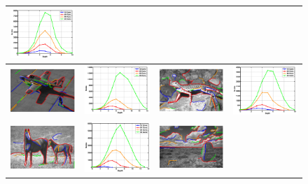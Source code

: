 \begin{figure}[ht]
\begin{tabular}{|cc|cc|}
\includegraphics[width=0.245\linewidth]{figs/134008_stats.pdf} \\
\hline
\includegraphics[width=0.245\linewidth]{figs/37073_cons_stats.pdf} &
\includegraphics[width=0.245\linewidth]{figs/37073_stats.pdf} &
\includegraphics[width=0.245\linewidth]{figs/87046_cons_stats.pdf} &
\includegraphics[width=0.245\linewidth]{figs/87046_stats.pdf} \\
\hline
\includegraphics[width=0.245\linewidth]{figs/113016_cons_stats.pdf} &
\includegraphics[width=0.245\linewidth]{figs/113016_stats.pdf} &
\includegraphics[width=0.245\linewidth]{figs/216066_cons_stats.pdf} &

\end{tabular}
\end{figure}
